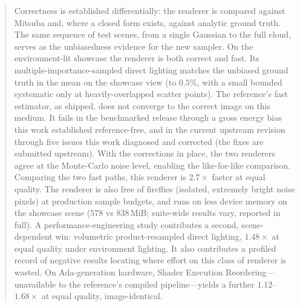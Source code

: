 \begin{abstract}
Correctness is established differentially: the renderer is compared against Mitsuba and,
where a closed form exists, against analytic ground truth. The same sequence of test
scenes, from a single Gaussian to the full cloud, serves as the unbiasedness evidence for the new
sampler. On the environment-lit showcase the renderer is both correct and fast.
Its multiple-importance-sampled direct lighting matches the unbiased ground truth in the mean on the showcase view (to $0.5\%$,
with a small bounded systematic only at heavily-overlapped scatter points). The reference's fast estimator, as shipped, does not converge to the correct image on this
medium. It fails in the benchmarked release through a gross energy bias this work established
reference-free, and in the current upstream revision through five issues this work diagnosed and corrected (the fixes are submitted upstream). With the corrections in place, the two renderers agree at the Monte-Carlo noise level,
enabling the like-for-like comparison. Comparing the two fast paths, this renderer is $2.7\times$ faster at equal quality. The renderer is also free of fireflies (isolated, extremely bright noise pixels) at production sample budgets, and runs on less device memory
on the showcase scene ($578$ vs $838$\,MiB; suite-wide results vary, reported in full). A performance-engineering study contributes a second, scene-dependent win: volumetric product-resampled direct
lighting, $1.48\times$ at equal quality under environment lighting. It also contributes a profiled record of
negative results locating where effort on this class of renderer is wasted. On
Ada-generation hardware, Shader Execution Reordering---unavailable to the reference's
compiled pipeline---yields a further $1.12$--$1.68\times$ at equal quality, image-identical.

\end{abstract}
